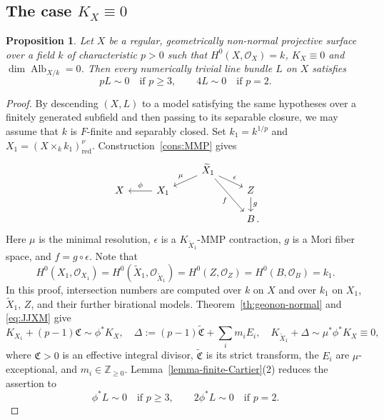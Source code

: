 \documentclass[10pt,abstract=true]{scrartcl}
\numberwithin{equation}{section}
\newtheorem{proposition}[theorem]{Proposition}
\theoremstyle{definition}
\theoremstyle{remark}
\DeclareMathOperator\Alb{Alb}
\begin{document}
\subsection{The case \texorpdfstring{$K_X\equiv0$}{K\_X numerically trivial}}\label{sec:caseC-numerically-trivial}
\begin{proposition}\label{prop:Alb-trivial}
  Let $X$ be a regular, geometrically non-normal projective surface over a field $k$ of characteristic $p>0$ such that $H^0(X,\mathcal O_X)=k$, $K_X\equiv0$ and $\dim\Alb_{X/k}=0$.
  Then every numerically trivial line bundle $L$ on $X$ satisfies
  \[
    pL\sim0\quad\text{if }p\geq3,\qquad
    4L\sim0\quad\text{if }p=2.
  \]
\end{proposition}
\begin{proof}
  By descending $(X,L)$ to a model satisfying the same hypotheses over a finitely generated subfield and then passing to its separable closure, we may assume that $k$ is $F$-finite and separably closed.
  Set $k_1=k^{1/p}$ and $X_1=(X\times_k k_1)_{\mathrm{red}}^\nu$.
  Construction~\ref{cons:MMP} gives
  \[
    \begin{tikzcd}[row sep=tiny]
      && \widetilde X_1 \ar[ld,"\mu"'] \ar[rd,"\epsilon"] \ar[rdd,"f"'] \\
      X & X_1 \ar[l,"\phi"'] && Z \ar[d,"g"] \\[2ex]
        &&& B\rlap{\,.}
    \end{tikzcd}
  \]
  Here $\mu$ is the minimal resolution, $\epsilon$ is a $K_{\widetilde X_1}$-MMP contraction, $g$ is a Mori fiber space, and $f=g\circ\epsilon$.
  Note that
  \[
    H^0(X_1,\mathcal O_{X_1})=H^0(\widetilde X_1,\mathcal O_{\widetilde X_1})
      =H^0(Z,\mathcal O_Z)=H^0(B,\mathcal O_B)=k_1.
  \]
  In this proof, intersection numbers are computed over $k$ on $X$ and over $k_1$ on $X_1$, $\widetilde X_1$, $Z$, and their further birational models.
  Theorem~\ref{th:geonon-normal} and \eqref{eq:JJXM} give
  \begin{equation}\label{eq:caseC-boundary}
      K_{X_1}+(p-1)\mathfrak C\sim\phi^*K_X,\quad \Delta:=(p-1)\widetilde{\mathfrak C}+\sum_i m_iE_i, \quad K_{\widetilde X_1}+\Delta\sim\mu^*\phi^*K_X\equiv0,
  \end{equation}
  where $\mathfrak C>0$ is an effective integral divisor, $\widetilde{\mathfrak C}$ is its strict transform, the $E_i$ are $\mu$-exceptional, and $m_i\in\mathbb Z_{\geq0}$.
  Lemma~\ref{lemma-finite-Cartier}\textup{(2)} reduces the assertion to
  \begin{equation}\label{eq:goal-C}
    \phi^*L\sim0\quad\text{if }p\geq3,\qquad
    2\phi^*L\sim0\quad\text{if }p=2.
  \end{equation}


\end{proof}
\end{document}
